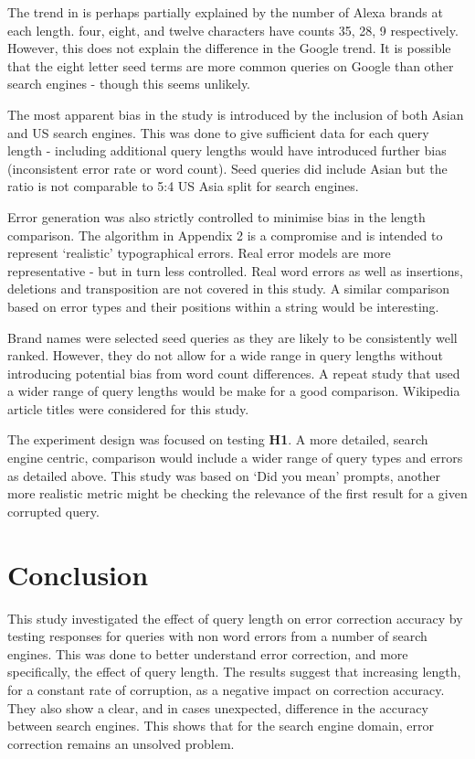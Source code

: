 \documentclass{csfourzero}
\begin{document}
The trend in is perhaps partially explained by the number of Alexa brands at each length. four, eight, and twelve characters have counts 35, 28, 9 respectively. However, this does not explain the difference in the Google trend. It is possible that the eight letter seed terms are more common queries on Google than other search engines - though this seems unlikely.

The most apparent bias in the study is introduced by the inclusion of both Asian and US search engines. This was done to give sufficient data for each query length - including additional query lengths would have introduced further bias (inconsistent error rate or word count). Seed queries did include Asian but the ratio is not comparable to 5:4 US Asia split for search engines.

Error generation was also strictly controlled to minimise bias in the length comparison. The algorithm in Appendix 2 is a compromise and is intended to represent `realistic' typographical errors. Real error models are more representative - but in turn less controlled. Real word errors as well as insertions, deletions and transposition are not covered in this study. A similar comparison based on error types and their positions within a string would be interesting.

Brand names were selected seed queries as they are likely to be consistently well ranked. However, they do not allow for a wide range in query lengths without introducing potential bias from word count differences. A repeat study that used a wider range of query lengths would be make for a good comparison. Wikipedia article titles were considered for this study.

The experiment design was focused on testing \textbf{H1}. A more detailed, search engine centric, comparison would include a wider range of query types and errors as detailed above. This study was based on `Did you mean' prompts, another more realistic metric might be checking the relevance of the first result for a given corrupted query.

\section{Conclusion}
\label{sec:conc}

This study investigated the effect of query length on error correction accuracy by testing responses for queries with non word errors from a number of search engines. This was done to better understand error correction, and more specifically, the effect of query length. The results suggest that increasing length, for a constant rate of corruption, as a negative impact on correction accuracy. They also show a clear, and in cases unexpected, difference in the accuracy between search engines. This shows that for the search engine domain, error correction remains an unsolved problem.
\end{document}
